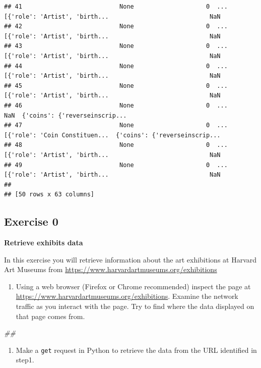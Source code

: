 \documentclass[
]{book}
\newenvironment{Shaded}{\begin{snugshade}}{\end{snugshade}}
\newcommand{\CommentTok}[1]{\textcolor[rgb]{0.56,0.35,0.01}{\textit{#1}}}
\providecommand{\tightlist}{%
  \setlength{\itemsep}{0pt}\setlength{\parskip}{0pt}}
\begin{document}
\begin{verbatim}
## 41                           None                    0  ...  [{'role': 'Artist', 'birth...                            NaN
## 42                           None                    0  ...  [{'role': 'Artist', 'birth...                            NaN
## 43                           None                    0  ...  [{'role': 'Artist', 'birth...                            NaN
## 44                           None                    0  ...  [{'role': 'Artist', 'birth...                            NaN
## 45                           None                    0  ...  [{'role': 'Artist', 'birth...                            NaN
## 46                           None                    0  ...                            NaN  {'coins': {'reverseinscrip...
## 47                           None                    0  ...  [{'role': 'Coin Constituen...  {'coins': {'reverseinscrip...
## 48                           None                    0  ...  [{'role': 'Artist', 'birth...                            NaN
## 49                           None                    0  ...  [{'role': 'Artist', 'birth...                            NaN
## 
## [50 rows x 63 columns]
\end{verbatim}

\hypertarget{exercise-0-4}{%
\subsection{Exercise 0}\label{exercise-0-4}}

\textbf{Retrieve exhibits data}

In this exercise you will retrieve information about the art exhibitions at Harvard Art Museums from \url{https://www.harvardartmuseums.org/exhibitions}

\begin{enumerate}
\def\labelenumi{\arabic{enumi}.}
\tightlist
\item
  Using a web browser (Firefox or Chrome recommended) inspect the
  page at \url{https://www.harvardartmuseums.org/exhibitions}. Examine
  the network traffic as you interact with the page. Try to find
  where the data displayed on that page comes from.
\end{enumerate}

\begin{Shaded}
\begin{Highlighting}[]
\CommentTok{\#\#}
\end{Highlighting}
\end{Shaded}

\begin{enumerate}
\def\labelenumi{\arabic{enumi}.}
\setcounter{enumi}{1}
\tightlist
\item
  Make a \texttt{get} request in Python to retrieve the data from the URL
  identified in step1.
\end{enumerate}
\end{document}
